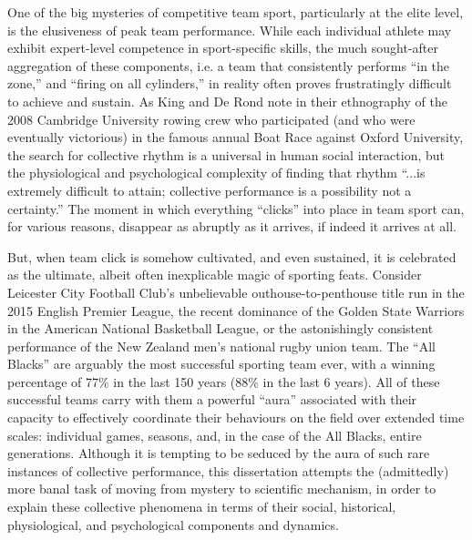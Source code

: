 \begin{CJK}{UTF8}{gbsn}
One of the big mysteries of competitive team sport, particularly at the elite level, is the elusiveness of peak team performance.  While each individual athlete may exhibit expert-level competence in sport-specific skills, the much sought-after aggregation of these components, i.e. a team that consistently performs ``in the zone,'' and ``firing on all cylinders,'' in reality often proves frustratingly difficult to achieve and sustain.  As King and De Rond \textcite[568]{King2011} note in their ethnography of the 2008 Cambridge University rowing crew who participated (and who were eventually victorious) in the famous annual Boat Race against Oxford University, the search for collective rhythm is a universal in human social interaction, but  the physiological and psychological complexity of finding that rhythm ``...is extremely difficult to attain; collective performance is a possibility not a certainty.''   The moment in which everything ``clicks'' into place in team sport can, for various reasons, disappear as abruptly as it arrives, if indeed it arrives at all.

But, when team click is somehow cultivated, and even sustained, it is celebrated as the ultimate, albeit often inexplicable magic of sporting feats. Consider Leicester City Football Club's unbelievable outhouse-to-penthouse title run in the 2015 English Premier League, the recent dominance of the Golden State Warriors in the American National Basketball League, or the astonishingly consistent performance of the New Zealand men's national rugby union team.  The ``All Blacks'' are arguably the most successful sporting team ever, with a winning percentage of 77\% in the last 150 years (88\% in the last 6 years).  All of these successful teams carry with them a powerful ``aura'' associated with their capacity to effectively coordinate their behaviours on the field over extended time scales: individual games, seasons, and, in the case of the All Blacks, entire generations.  Although it is tempting to be seduced by the aura of such rare instances of collective performance, this dissertation attempts the (admittedly) more banal task of moving from mystery to scientific mechanism, in order to explain these collective phenomena in terms of their social, historical, physiological, and psychological components and dynamics.


\end{CJK}

